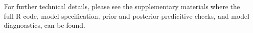 \documentclass[9pt,twocolumn,twoside,lineno]{pnas-new}
\begin{document}
For further technical details, please see the supplementary materials where the full R code, model specification, prior and posterior predicitive checks, and model diagnoastics, can be found. 







\showmatmethods{} %


\showacknow{} %

 

\end{document}

